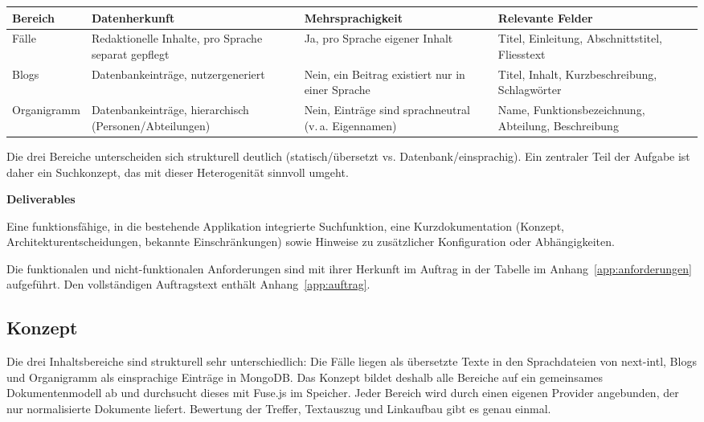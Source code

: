 \documentclass[11pt,a4paper]{article}
\newcommand{\minihead}[1]{\par\needspace{5\baselineskip}\noindent\textbf{#1}\par\nobreak}
\let\oldsubsection\subsection
\renewcommand{\subsection}{\needspace{6\baselineskip}\oldsubsection}
\begin{document}
\begin{center}
\small
\begin{tabularx}{\textwidth}{>{\raggedright\arraybackslash}p{2.3cm} >{\raggedright\arraybackslash}X >{\raggedright\arraybackslash}p{2.6cm} >{\raggedright\arraybackslash}X}
\toprule
\textbf{Bereich} & \textbf{Datenherkunft} & \textbf{Mehrsprachigkeit} & \textbf{Relevante Felder} \\
\midrule
Fälle & Redaktionelle Inhalte, pro Sprache separat gepflegt & Ja, pro Sprache eigener Inhalt & Titel, Einleitung, Abschnittstitel, Fliesstext \\
Blogs & Datenbankeinträge, nutzergeneriert & Nein, ein Beitrag existiert nur in einer Sprache & Titel, Inhalt, Kurzbeschreibung, Schlagwörter \\
Organigramm & Datenbankeinträge, hierarchisch (Personen/Abteilungen) & Nein, Einträge sind sprachneutral (v.\,a. Eigennamen) & Name, Funktionsbezeichnung, Abteilung, Beschreibung \\
\bottomrule
\end{tabularx}
\end{center}

Die drei Bereiche unterscheiden sich strukturell deutlich (statisch/übersetzt vs. Datenbank/einsprachig). Ein zentraler Teil der Aufgabe ist daher ein Suchkonzept, das mit dieser Heterogenität sinnvoll umgeht.

\minihead{Deliverables}
Eine funktionsfähige, in die bestehende Applikation integrierte Suchfunktion, eine Kurzdokumentation (Konzept, Architekturentscheidungen, bekannte Einschränkungen) sowie Hinweise zu zusätzlicher Konfiguration oder Abhängigkeiten.

Die funktionalen und nicht-funktionalen Anforderungen sind mit ihrer Herkunft im Auftrag in der Tabelle im Anhang~\ref{app:anforderungen} aufgeführt. Den vollständigen Auftragstext enthält Anhang~\ref{app:auftrag}.

\subsection{Konzept}
Die drei Inhaltsbereiche sind strukturell sehr unterschiedlich: Die Fälle liegen als übersetzte Texte in den Sprachdateien von next-intl, Blogs und Organigramm als einsprachige Einträge in MongoDB. Das Konzept bildet deshalb alle Bereiche auf ein gemeinsames Dokumentenmodell ab und durchsucht dieses mit Fuse.js im Speicher. Jeder Bereich wird durch einen eigenen Provider angebunden, der nur normalisierte Dokumente liefert. Bewertung der Treffer, Textauszug und Linkaufbau gibt es genau einmal.
\end{document}
